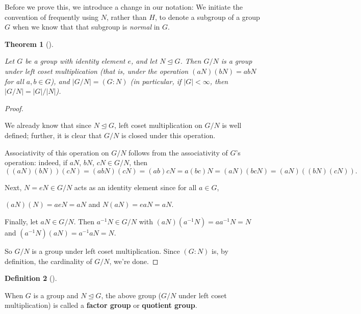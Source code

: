 \documentclass[10pt,]{book}
\newcommand{\terminology}[1]{\textbf{#1}}
\theoremstyle{plain}
\newtheorem{theorem}{Theorem}[section]
\theoremstyle{definition}
\newtheorem{definition}[theorem]{Definition}
\theoremstyle{definition}
\theoremstyle{definition}
\theoremstyle{definition}
\numberwithin{equation}{section}
\newcommand{\lt}{ < }
\begin{document}
    Before we prove this, we introduce a change in our notation: We
    initiate the convention of frequently using \(N\), rather than \(H\), to
    denote a subgroup of a group \(G\) when we know that that subgroup is
    \emph{normal} in \(G\).
\begin{theorem}[{}]\label{theorem-51}

        Let \(G\) be a group with identity element \(e\), and let \(N\unlhd G\). Then \(G/N\) is a
        group under left coset multiplication (that is, under the operation
        \((aN)(bN)=abN\) for all \(a,b\in G\)), and \(|G/N|=(G:N)\) (in
        particular, if \(|G|\lt \infty\), then \(|G/N|=|G|/|N|\)).
\end{theorem}
\begin{proof}\hypertarget{proof-46}{}

      We already know that since \(N\unlhd G\), left coset
      multiplication on \(G/N\) is well defined; further, it is clear
      that \(G/N\) is closed under this operation.
\par

      Associativity of this operation on \(G/N\) follows from the
      associativity of \(G\)'s operation: indeed, if \(aN\), \(bN\), \(cN \in
      G/N\), then
\begin{equation*}

        ((aN)(bN))(cN)=(abN)(cN)=(ab)cN=a(bc)N=(aN)(bcN)=(aN)((bN)(cN)).
      
\end{equation*}

\par

      Next, \(N=eN\in G/N\) acts as an identity element since for all \(a\in
      G\),
\par

      \((aN)(N)=aeN=aN\) and \(N(aN)=eaN=aN\).
\par

      Finally, let \(aN\in G/N\). Then \(a^{-1}N\in G/N\) with
      \((aN)(a^{-1}N)=aa^{-1}N=N\) and \((a^{-1}N)(aN)=a^{-1}aN=N\).
\par

      So \(G/N\) is a group under left coset multiplication. Since \((G:N)\)
      is, by definition, the cardinality of \(G/N\), we're done.
\end{proof}
\begin{definition}[{}]\label{definition-67}

        When \(G\) is a group and \(N\unlhd G\), the above group
        (\(G/N\) under left coset multiplication) is called a \terminology{factor
        group} or \terminology{quotient group}.
\label{notation-74}
\end{definition}
\end{document}
